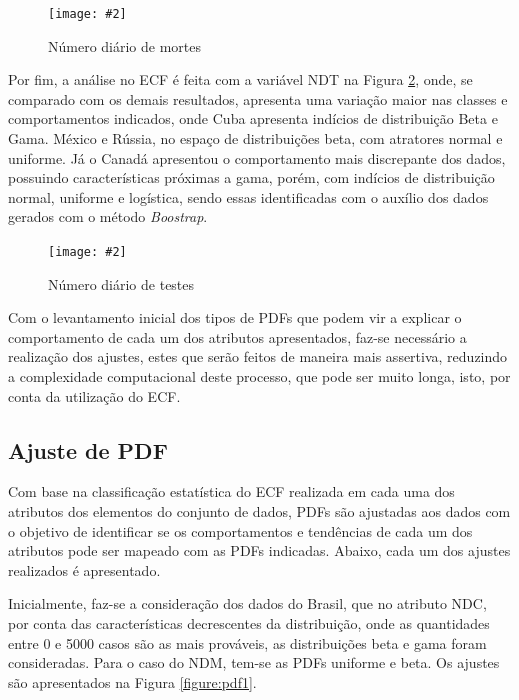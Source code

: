 \documentclass[a4paper,12pt]{article}
\newcommand{\image}[4]{
    \begin{figure}[H]%
        \begin{center}
        \caption{#3}
        \texttt{[image: \#2]}
        \label{#4}
        \end{center}
    \end{figure}
}
\begin{document}
\image{0.5}{images/cullen_frey/2_histograma_mortesdiarias}{Número diário de mortes}{figure:ndc_cf2}

\par Por fim, a análise no ECF é feita com a variável NDT na Figura \ref{figure:ndc_cf3}, onde, se comparado com os demais resultados, apresenta uma variação maior nas classes e comportamentos indicados, onde Cuba apresenta indícios de distribuição Beta e Gama. México e Rússia, no espaço de distribuições beta, com atratores normal e uniforme. Já o Canadá apresentou o comportamento mais discrepante dos dados, possuindo características próximas a gama, porém, com indícios de distribuição normal, uniforme e logística, sendo essas identificadas com o auxílio dos dados gerados com o método \textit{Boostrap}.

\image{0.53}{images/cullen_frey/3_histograma_testesdiarios}{Número diário de testes}{figure:ndc_cf3}

\par Com o levantamento inicial dos tipos de PDFs que podem vir a explicar o comportamento de cada um dos atributos apresentados, faz-se necessário a realização dos ajustes, estes que serão feitos de maneira mais assertiva, reduzindo a complexidade computacional deste processo, que pode ser muito longa, isto, por conta da utilização do ECF.

\subsection{Ajuste de PDF}

\par Com base na classificação estatística do ECF realizada em cada uma dos atributos dos elementos do conjunto de dados, PDFs são ajustadas aos dados com o objetivo de identificar se os comportamentos e tendências de cada um dos atributos pode ser mapeado com as PDFs indicadas. Abaixo, cada um dos ajustes realizados é apresentado.

\par Inicialmente, faz-se a consideração dos dados do Brasil, que no atributo NDC, por conta das características decrescentes da distribuição, onde as quantidades entre 0 e 5000 casos são as mais prováveis, as distribuições beta e gama foram consideradas. Para o caso do NDM, tem-se as PDFs uniforme e beta. Os ajustes são apresentados na Figura \ref{figure:pdf1}.
\end{document}

